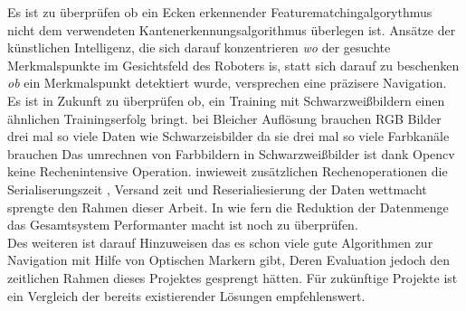 \documentclass[conference]{IEEEtran}
\begin{document}
Es ist zu überprüfen ob ein Ecken erkennender Featurematchingalgorythmus nicht dem verwendeten  Kantenerkennungsalgorithmus überlegen ist. Ansätze der künstlichen Intelligenz, die sich darauf konzentrieren \textit{wo} der gesuchte Merkmalspunkte  im Gesichtsfeld des Roboters is, statt sich darauf zu beschenken \textit{ob} ein Merkmalspunkt detektiert wurde, versprechen eine präzisere Navigation. \\
Es ist in Zukunft zu überprüfen ob, ein Training mit Schwarzweißbildern einen ähnlichen Trainingserfolg bringt.  bei Bleicher Auflösung brauchen RGB Bilder drei mal so viele Daten wie Schwarzeisbilder da sie drei mal so viele Farbkanäle brauchen Das umrechnen von Farbbildern in Schwarzweißbilder ist dank Opencv keine Rechenintensive Operation. inwieweit  zusätzlichen Rechenoperationen die Serialiserungszeit , Versand zeit und Reserialiesierung der Daten wettmacht sprengte den Rahmen dieser Arbeit. In wie fern die Reduktion der Datenmenge das Gesamtsystem Performanter macht ist noch zu überprüfen.
\\
Des weiteren ist darauf Hinzuweisen das es schon viele gute Algorithmen zur Navigation mit Hilfe von Optischen Markern gibt, Deren Evaluation jedoch den zeitlichen Rahmen dieses Projektes gesprengt hätten. Für zukünftige Projekte ist ein Vergleich der bereits existierender Lösungen empfehlenswert.
\end{document}
